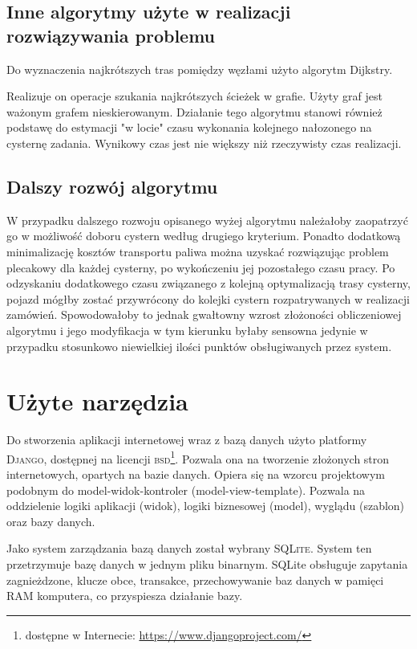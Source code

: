 \documentclass[11pt,a4paper,oneside]{mwart}
\begin{document}
\subsection{Inne algorytmy użyte w realizacji rozwiązywania problemu}
	Do wyznaczenia najkrótszych tras pomiędzy węzłami użyto algorytm Dijkstry.

	Realizuje on operacje szukania najkrótszych ścieżek w grafie. Użyty graf jest ważonym grafem nieskierowanym. Działanie tego algorytmu stanowi również podstawę do estymacji "w locie" czasu wykonania kolejnego nałozonego na cysternę zadania.	Wynikowy czas jest nie większy niż rzeczywisty czas realizacji.

  \subsection{Dalszy rozwój algorytmu}

	W przypadku dalszego rozwoju opisanego wyżej algorytmu należałoby zaopatrzyć go w możliwość doboru cystern według drugiego kryterium. Ponadto dodatkową minimalizację kosztów transportu paliwa można uzyskać rozwiązując problem plecakowy dla każdej cysterny, po wykończeniu jej pozostałego czasu pracy. Po odzyskaniu dodatkowego czasu związanego z kolejną optymalizacją trasy cysterny, pojazd mógłby zostać przywrócony do kolejki cystern rozpatrywanych w realizacji zamówień. Spowodowałoby to jednak gwałtowny wzrost złożoności obliczeniowej algorytmu i jego modyfikacja w tym kierunku byłaby sensowna jedynie w przypadku stosunkowo niewielkiej ilości punktów obsługiwanych przez system.


 
\section{Użyte narzędzia}

Do stworzenia aplikacji internetowej wraz z bazą danych użyto platformy \textsc{Django}, dostępnej na licencji \textsc{bsd}\footnote{dostępne w Internecie: \url{https://www.djangoproject.com/}}. Pozwala ona na tworzenie złożonych stron internetowych, opartych na bazie danych. Opiera się na wzorcu projektowym podobnym do model-widok-kontroler (model-view-template). Pozwala na oddzielenie logiki aplikacji (widok), logiki biznesowej (model), wyglądu (szablon) oraz bazy danych.

Jako system zarządzania bazą danych został wybrany \textsc{SQLite}. System ten przetrzymuje bazę danych w jednym pliku binarnym.
SQLite obsługuje zapytania zagnieżdzone, klucze obce, transakce, przechowywanie baz danych w pamięci RAM komputera, co przyspiesza działanie bazy.
\end{document}

